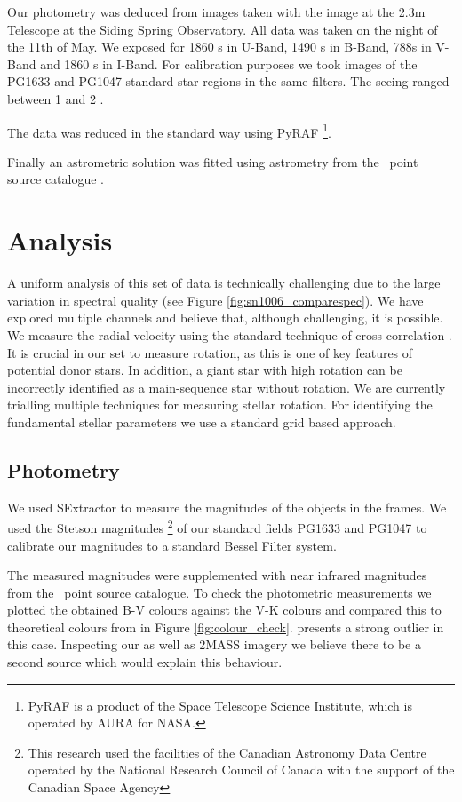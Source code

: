 Our photometry was deduced from images taken with the image at the 2.3m Telescope at the Siding Spring Observatory. All data was taken on the night of the 11th of May. We exposed for 1860 s in U-Band, 1490 s in B-Band, 788s in V-Band and 1860 s in I-Band. For calibration purposes we took images of the PG1633 and PG1047 standard star regions in the same filters. The seeing ranged between 1 and 2 \arcsec. 

The data was reduced in the standard way using PyRAF \footnote{PyRAF is a product of the Space Telescope Science Institute, which is operated by AURA for NASA.}.

Finally an astrometric solution was fitted using astrometry from the \twomass\ point source catalogue \citep{2006AJ....131.1163S}. 


\section{Analysis}

A uniform analysis of this set of data is technically challenging due to the large variation in spectral quality (see Figure \ref{fig:sn1006_comparespec}). We have explored multiple channels and believe that, although challenging, it is possible. We measure the radial velocity using the standard technique of cross-correlation \citep{1979AJ.....84.1511T}. 
It is crucial in our set to measure rotation, as this is one of key features of potential donor stars. In addition, a giant star with high rotation can be incorrectly identified as a main-sequence star without rotation. We are currently trialling multiple techniques for measuring stellar rotation. For identifying the fundamental stellar parameters we use a standard grid based approach. 

\subsection{Photometry}
We used SExtractor \citep{1996A&AS..117..393B} to measure the magnitudes of the objects in the frames. We used the Stetson magnitudes \footnote{This research used the facilities of the Canadian Astronomy Data Centre operated by the National Research Council of Canada with the support of the Canadian Space Agency}  of our standard fields PG1633 and PG1047 to calibrate our magnitudes to a standard Bessel Filter system. 

The measured  magnitudes were supplemented with near infrared magnitudes from the \twomass\ point source catalogue.
To check the photometric measurements we plotted the obtained B-V colours against the V-K colours and compared this to theoretical colours from \citep{2010A&A...512A..54C} in Figure \ref{fig:colour_check}.   presents a strong outlier in this case. Inspecting our as well as 2MASS imagery we believe there to be a second source which would explain this behaviour. 

